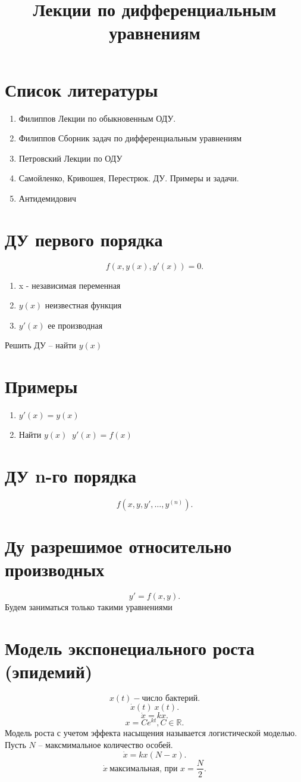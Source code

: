 \documentclass[14pt]{extarticle}
\title{Лекции по дифференциальным уравнениям}
\author{}
\date{}
\begin{document}
\maketitle
\section{Список литературы}
\begin{enumerate}
	\item Филиппов Лекции по обыкновенным ОДУ.
	\item Филиппов Сборник задач по дифференциальным уравнениям
	\item Петровский Лекции по ОДУ
	\item Самойленко, Кривошея, Перестрюк. ДУ. Примеры и задачи.
	\item Антидемидович
\end{enumerate}
\section{ДУ первого порядка}
\[
	f(x,y(x),y'(x)) = 0
	.\]
\begin{enumerate}
	\item x - независимая переменная
	\item $y(x)$ неизвестная функция
	\item  $y'(x)$ ее производная
\end{enumerate}
Решить ДУ -- найти $y(x)$
\section{Примеры}
\begin{enumerate}
	\item $y'(x) = y(x)$
	\item Найти  $y(x) ~$  $y'(x) = f(x)$
\end{enumerate}
\section{ДУ n-го порядка}
\[
	f(x,y,y',\dots,y^{(n)})
	.\]
\section{Ду разрешимое относительно производных}
\[
	y' = f(x,y)
	.\]
Будем заниматься только такими уравнениями
\section{Модель экспонециального роста (эпидемий)}
\[
	x(t) - \text{число бактерий}
	.\]
\[
	\dot{x}(t) ~ x(t)
	.\]
\[
	\dot{x} = kx
	.\]
\[
	x = C e^{kt}, C \in \mathbb{R}
	.\]
Модель роста с учетом эффекта насыщения называется логистической моделью.\\
Пусть $N$ -- максмимальное количество особей.
\[
	\dot{x} = kx (N - x)
	.\]
\[
	\dot{x} ~\text{максимальная, при } x = \frac{N}{2}
	.\]
\end{document}

